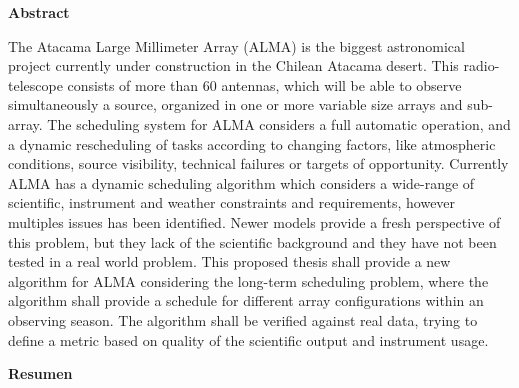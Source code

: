\thispagestyle{empty}
\vspace*{\fill}

\begin{center}
\begin{LARGE}\textbf{Abstract}\end{LARGE}
\end{center}

The Atacama Large Millimeter Array (ALMA) is the biggest astronomical project currently under
construction in the Chilean Atacama desert. This radio-telescope consists of more than 60
antennas, which will be able to observe simultaneously a source, organized in one or more
variable size arrays and sub-array. The scheduling system for ALMA considers a full automatic
operation, and a dynamic rescheduling of tasks according to changing factors, like atmospheric
conditions, source visibility, technical failures or targets of opportunity.
Currently ALMA has a dynamic scheduling algorithm which considers a wide-range of scientific,
instrument and weather constraints and requirements, however multiples issues has been
identified. Newer models provide a fresh perspective of this problem, but they lack of the
scientific background and they have not been tested in a real world problem. This proposed thesis
shall provide a new algorithm for ALMA considering the long-term scheduling problem, where
the algorithm shall provide a schedule for different array configurations within an observing
season. The algorithm shall be verified against real data, trying to define a metric based on quality
of the scientific output and instrument usage.

\vspace{0.5cm}

\begin{center}
\begin{LARGE}\textbf{Resumen}\end{LARGE}
\end{center}

